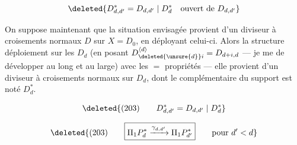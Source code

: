\[
\deleted{D_{d,d'}^*=D_{d,d'}\mid D_d^*\quad\text{ouvert de }D_{d,d'}}
\]

On suppose maintenant que la situation envisagée provient d'un diviseur à croisements normaux $D$ sur $X=D_0$, en déployant celui-ci. Alors  la structure  déploiement  sur les $D_d$ (en posant $D_{\deleted{\unsure{d}}i}^{\langle d\rangle}=D_{d+i,d}$ --- je me  de développer au long et au large) avec les $=$ propriétés --- elle provient d'un diviseur à croisements normaux  sur $D_d$, dont le complémentaire du support est noté $D_d^*$.

\[
\deleted{(203)\qquad D_{d,d'}^*=D_{d,d'}\mid D_d^*}
\]

\[
\deleted{(203)\qquad\boxed{\Pi_1P_d^*\xrightarrow{\gamma_{d,d'}}\Pi_1P_{d'}^*}\qquad\text{pour }d'<d}
\]
